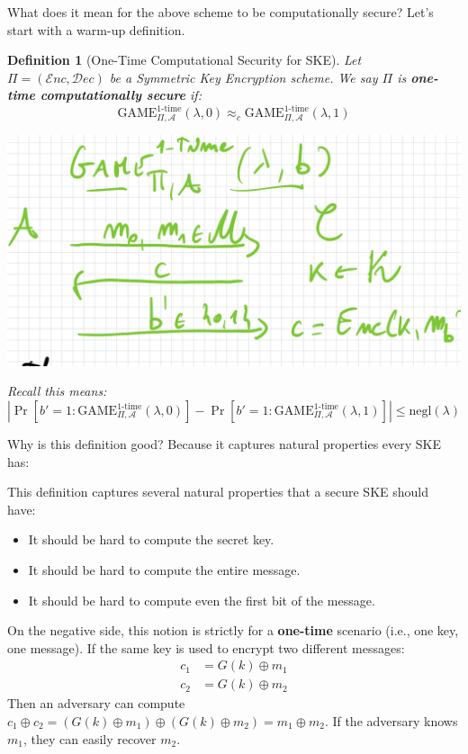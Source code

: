 \documentclass[11pt, a4paper]{article}
\newcommand{\enc}{\mathcal{E}nc}
\newcommand{\dec}{\mathcal{D}ec}
\newcommand{\game}{\text{GAME}}
\newtheorem{defn}{Definition}
\begin{document}
What does it mean for the above scheme to be computationally secure? Let's start with a warm-up definition.

\begin{defn}[One-Time Computational Security for SKE]

Let $\Pi = (\enc, \dec)$ be a Symmetric Key Encryption scheme. We say $\Pi$ is \textbf{one-time computationally secure} if:\\
$$ \game_{\Pi, \mathcal{A}}^{1\text{-time}}(\lambda, 0) \approx_c \game_{\Pi, \mathcal{A}}^{1\text{-time}}(\lambda, 1) $$
\begin{center}
    \includegraphics[scale=0.4]{img/Comp_sec/example1.png}
\end{center}
Recall this means:
$$|\Pr[b' = 1\colon \game_{\Pi, \mathcal{A}}^{1\text{-time}}(\lambda, 0)] - \Pr[b' = 1\colon \game_{\Pi, \mathcal{A}}^{1\text{-time}}(\lambda, 1)]| \leq \text{negl}(\lambda)$$
\end{defn}
Why is this definition good? Because it captures natural properties every SKE has:

This definition captures several natural properties that a secure SKE should have:
\begin{itemize}
    \item It should be hard to compute the secret key.
    \item It should be hard to compute the entire message.
    \item It should be hard to compute even the first bit of the message.
\end{itemize}


On the negative side, this notion is strictly for a \textbf{one-time} scenario (i.e., one key, one message). If the same key is used to encrypt two different messages:
\begin{align*}
    c_1 &= G(k) \oplus m_1 \\
    c_2 &= G(k) \oplus m_2
\end{align*}
Then an adversary can compute $c_1 \oplus c_2 = (G(k) \oplus m_1) \oplus (G(k) \oplus m_2) = m_1 \oplus m_2$. If the adversary knows $m_1$, they can easily recover $m_2$.
\end{document}
